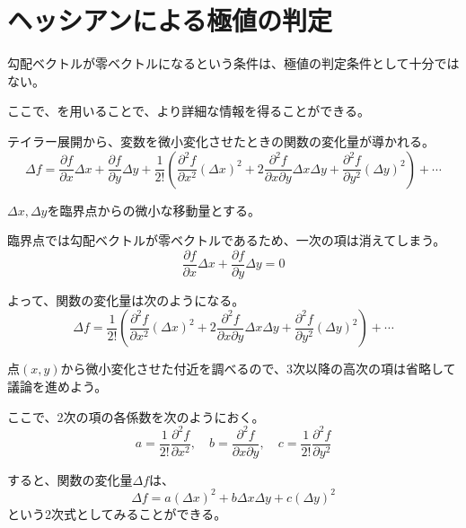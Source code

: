 \documentclass[../../../topic_calculus]{subfiles}
\begin{document}
\sectionline
\section{ヘッシアンによる極値の判定}

勾配ベクトルが零ベクトルになるという条件は、極値の判定条件として十分ではない。

ここで、を用いることで、より詳細な情報を得ることができる。

\begin{review}
  テイラー展開から、変数を微小変化させたときの関数の変化量が導かれる。
  \begin{equation*}
    \Delta f = \frac{\partial f}{\partial x}\Delta x + \frac{\partial f}{\partial y}\Delta y + \frac{1}{2!}\left(\frac{\partial^2 f}{\partial x^2}(\Delta x)^2 + 2\frac{\partial^2 f}{\partial x \partial y}\Delta x \Delta y + \frac{\partial^2 f}{\partial y^2}(\Delta y)^2\right) + \cdots
  \end{equation*}
\end{review}

$\Delta x, \Delta y$を臨界点からの微小な移動量とする。

臨界点では勾配ベクトルが零ベクトルであるため、一次の項は消えてしまう。
\begin{equation*}
  \frac{\partial f}{\partial x}\Delta x + \frac{\partial f}{\partial y}\Delta y = 0
\end{equation*}

よって、関数の変化量は次のようになる。
\begin{equation*}
  \Delta f = \frac{1}{2!}\left(\frac{\partial^2 f}{\partial x^2}(\Delta x)^2 + 2\frac{\partial^2 f}{\partial x \partial y}\Delta x \Delta y + \frac{\partial^2 f}{\partial y^2}(\Delta y)^2\right) + \cdots
\end{equation*}

\br

点$(x,y)$から微小変化させた付近を調べるので、3次以降の高次の項は省略して議論を進めよう。

ここで、2次の項の各係数を次のようにおく。
\begin{equation*}
  a = \frac{1}{2!}\frac{\partial^2 f}{\partial x^2}, \quad
  b = \frac{\partial^2 f}{\partial x \partial y}, \quad
  c = \frac{1}{2!}\frac{\partial^2 f}{\partial y^2}
\end{equation*}

すると、関数の変化量$\Delta f$は、
\begin{equation*}
  \Delta f = a(\Delta x)^2 + b\Delta x \Delta y + c(\Delta y)^2
\end{equation*}
という2次式としてみることができる。
\end{document}
